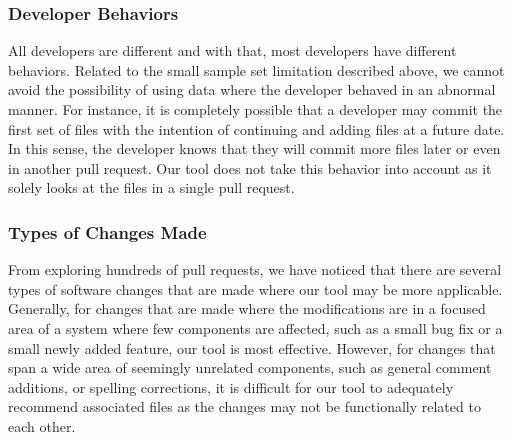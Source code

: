\subsubsection{Developer Behaviors}

All developers are different and with that, most developers have different behaviors. Related to the small sample set limitation described above, we cannot avoid the possibility of using data where the developer behaved in an abnormal manner. For instance, it is completely possible that a developer may commit the first set of files with the intention of continuing and adding files at a future date. In this sense, the developer knows that they will commit more files later or even in another pull request. Our tool does not take this behavior into account as it solely looks at the files in a single pull request.

\subsubsection{Types of Changes Made}

From exploring hundreds of pull requests, we have noticed that there are several types of software changes that are made where our tool may be more applicable. Generally, for changes that are made where the modifications are in a focused area of a system where few components are affected, such as a small bug fix or a small newly added feature, our tool is most effective. However, for changes that span a wide area of seemingly unrelated components, such as general comment additions, or spelling corrections, it is difficult for our tool to adequately recommend associated files as the changes may not be functionally related to each other.